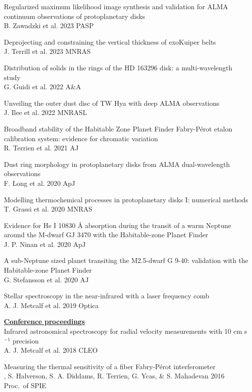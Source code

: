 \documentclass[10pt,preprint]{aastex}
\begin{document}
\noindent Regularized maximum likelihood image synthesis and validation for ALMA continuum
observations of protoplanetary disks \\
\indent B. Zawadzki et al. 2023 PASP

\noindent Deprojecting and constraining the vertical thickness of exoKuiper belts \\
\indent J. Terrill et al. 2023 MNRAS

\noindent Distribution of solids in the rings of the HD 163296 disk: a multi-wavelength study \\
\indent G. Guidi et al. 2022 A\&A 

\noindent Unveiling the outer dust disc of TW Hya with deep ALMA observations \\
\indent J. Ilee et al. 2022 MNRASL

\noindent Broadband stability of the Habitable Zone Planet Finder Fabry-P{\'e}rot etalon calibration system: evidence for chromatic variation \\
\indent R. Terrien et al. 2021 AJ 

\noindent Dust ring morphology in protoplanetary disks from ALMA dual-wavelength observations \\
\indent F. Long et al. 2020 ApJ 

\noindent Modelling thermochemical processes in protoplanetary
disks I: numerical methods \\
\indent T. Grassi et al. 2020 MNRAS

\noindent Evidence for He I 10830 \si{\angstrom} absorption during the transit of a warm Neptune around the M-dwarf GJ 3470 with the Habitable-zone Planet Finder \\
\indent J. P. Ninan et al. 2020 ApJ

\noindent A sub-Neptune sized planet transiting the M2.5-dwarf G 9-40: validation with the Habitable-zone Planet Finder \\
\indent G. Stefansson et al. 2020 AJ

\noindent Stellar spectroscopy in the near-infrared with a laser frequency comb \\
\indent A. J. Metcalf et al. 2019 Optica 

\noindent \underline{{\bf Conference proceedings}} \\
\noindent Infrared astronomical spectroscopy for radial velocity
measurements with 10 cm s$^{-1}$ precision \\
\indent A. J. Metcalf et al. 2018 CLEO

\noindent Measuring the thermal sensitivity of a fiber Fabry-P{\'e}rot interferometer \\
, S. Halverson, S. A. Diddams, R. Terrien, G. Ycas, \& S. Mahadevan 2016 Proc.~of SPIE
\end{document}
